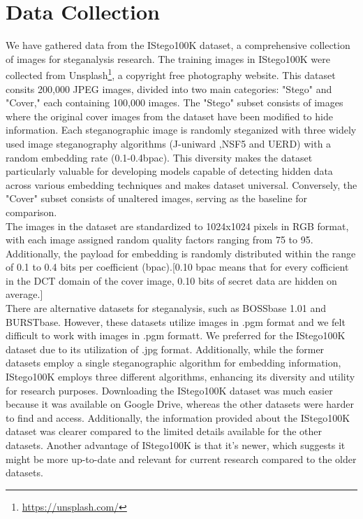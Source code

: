 \section{Data Collection} 
We have gathered data from the IStego100K dataset\cite{7}, a comprehensive collection of images for steganalysis research. The training images in IStego100K were collected from Unsplash\footnote{\url{https://unsplash.com/}}, a copyright free photography website. This dataset consits 200,000 JPEG images, divided into two main categories: "Stego" and "Cover," each containing 100,000 images. The "Stego" subset consists of images where the original cover images from the dataset have been modified to hide information. Each steganographic image is randomly steganized with three widely used image steganography algorithms (J-uniward\cite{22} ,NSF5\cite{17} and UERD\cite{13}) with a random embedding rate (0.1-0.4bpac). This diversity makes the dataset particularly valuable for developing models capable of detecting hidden data across various embedding techniques and makes dataset universal. Conversely, the "Cover" subset consists of unaltered images, serving as the baseline for comparison.\\
The images in the dataset are standardized to 1024x1024 pixels in RGB format, with each image assigned random quality factors ranging from 75 to 95. Additionally, the payload for embedding is randomly distributed within the range of 0.1 to 0.4 bits per coefficient (bpac).[0.10 bpac means that for every  cofficient in the DCT domain of the cover image, 0.10 bits of secret data are hidden on average.]\\
There are alternative datasets for steganalysis, such as BOSSbase 1.01 and BURSTbase. However, these datasets utilize images in .pgm format and we felt difficult to work with images in .pgm formatt. We preferred for the IStego100K dataset due to its utilization of .jpg format. Additionally, while the former datasets employ a single steganographic algorithm for embedding information, IStego100K employs three different algorithms, enhancing its diversity and utility for research purposes. Downloading the IStego100K dataset was much easier because it was available on Google Drive, whereas the other datasets were harder to find and access. Additionally, the information provided about the IStego100K dataset was clearer compared to the limited details available for the other datasets. Another advantage of IStego100K is that it's newer, which suggests it might be more up-to-date and relevant for current research compared to the older datasets. 


